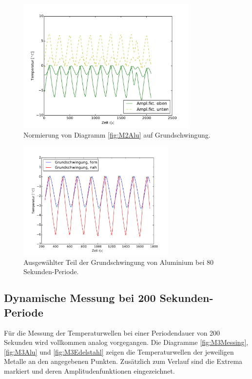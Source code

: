 \begin{figure}[h!]
	\centering
	\includegraphics[width=0.8\textwidth]{Bilder/Normierungsauswahl/M2_Messing_norm.pdf}
	\caption{Normierung von Diagramm \ref{fig:M2Alu} auf Grundschwingung.}
	\label{fig:M2AluNorm}
\end{figure}
\begin{figure}[h!]
	\centering
	\includegraphics[width=0.7\textwidth]{Bilder/M2_Alu_norm.pdf}
	\caption{Ausgewählter Teil der Grundschwingung von Aluminium bei 80 Sekunden-Periode.}
	\label{fig:M2AluNormkurve}
\end{figure}

\subsection{Dynamische Messung bei 200 Sekunden-Periode}
Für die Messung der Temperaturwellen bei einer Periodendauer von 200 Sekunden wird vollkommen analog vorgegangen.
Die Diagramme \ref{fig:M3Messing}, \ref{fig:M3Alu} und \ref{fig:M3Edelstahl} zeigen die Temperaturwellen der jeweiligen Metalle an den angegebenen Punkten. 
Zusätzlich zum Verlauf sind die Extrema markiert und deren Amplitudenfunktionen eingezeichnet.


